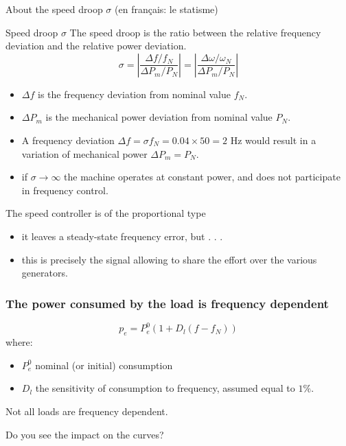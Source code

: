  \begin{frame}[allowframebreaks]{About the speed droop $\sigma$ (en français: le statisme)}
    
    \begin{block}{Speed droop $\sigma$}
        The speed droop is the ratio between the relative frequency deviation and the relative power deviation.
        $$\sigma = \left| \frac{\Delta f / f_N}{\Delta P_m/P_N} \right| = \left| \frac{\Delta \omega/\omega_N}{\Delta P_m/P_N} \right|$$
        \begin{itemize}
            \item $\Delta f$ is the frequency deviation from nominal value $f_N$.
            \item $\Delta P_m$ is the mechanical power deviation from nominal value $P_N$.
        \end{itemize}
    \end{block}
  
  \begin{itemize}
    \item A frequency deviation $\Delta f = \sigma f_N = 0.04 \times 50 = 2$ Hz would result in a variation of mechanical power $\Delta P_m = P_N$.
    \item if $\sigma \rightarrow \infty$ the machine operates at constant power, and does not participate in frequency control.
  \end{itemize}    
    
    \begin{block}{The speed controller is of the proportional type}
    \begin{itemize}
        \item it leaves a steady-state frequency error, but . . . 
        \item this is precisely the signal allowing to share the effort over the various generators.
    \end{itemize}
  \end{block}
\end{frame}

\begin{frame}
    \frametitle{The power consumed by the load is frequency dependent}
    $$p_e = P_e^0 (1+D_l (f-f_N) )$$
    where:
    \begin{itemize}
        \item $P^0_{e}$ nominal (or initial) consumption
        \item $D_l$ the sensitivity of consumption to frequency, assumed equal to $1\%$.
    \end{itemize}
    Not all loads are frequency dependent.

    \begin{block}{Do you see the impact on the curves? }
    \vspace*{1cm}
    \end{block}
    
\end{frame}

